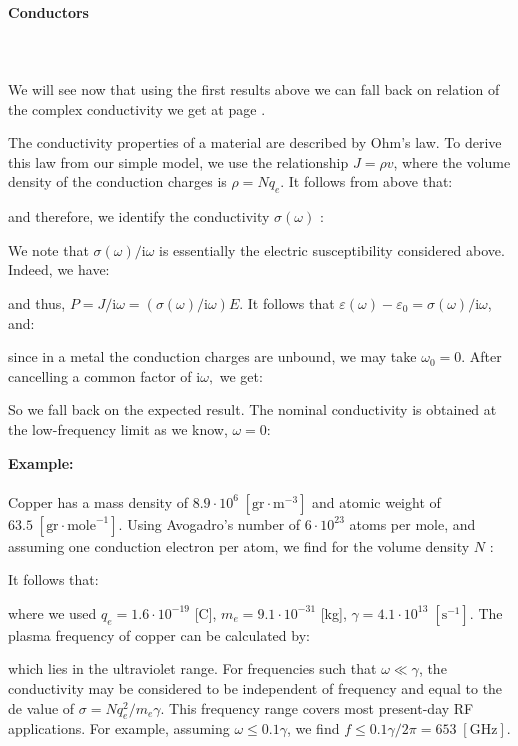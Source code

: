 	\paragraph{Conductors}\mbox{}\\\\
	We will see now that using the first results above we can fall back on relation of the complex conductivity we get at page \pageref{complex conductivity}.
	
	The conductivity properties of a material are described by Ohm's law. To derive this law from our simple model, we use the relationship $J=\rho v$, where the volume density of the conduction charges is $\rho=N q_e$. It follows from above that:
	
	and therefore, we identify the conductivity $\sigma(\omega)$ :
	
	We note that $\sigma(\omega) / \mathrm{i} \omega$ is essentially the electric susceptibility considered above. Indeed, we have:
	
	 and thus, $P=J / \mathrm{i} \omega=(\sigma(\omega) / \mathrm{i} \omega)E$. It follows that $\varepsilon(\omega)-\varepsilon_{0}=\sigma(\omega) / \mathrm{i}\omega$, and:
	
	since in a metal the conduction charges are unbound, we may take $\omega_{0}=0$. After cancelling a common factor of $\mathrm{i} \omega,$ we get:
	
	So we fall back on the expected result. The nominal conductivity is obtained at the low-frequency limit as we know, $\omega=0$:
	
	
	\begin{tcolorbox}[colframe=black,colback=white,sharp corners]
	\textbf{{\Large {}}Example:}\\\\
	Copper has a mass density of $8.9 \cdot 10^{6}\;[\text{gr}\cdot \text{m}^{-3}]$ and atomic weight of $63.5 \; [\text{gr}\cdot\text{mole}^{-1}]$. Using Avogadro's number of $6 \cdot 10^{23}$ atoms per mole, and assuming one conduction electron per atom, we find for the volume density $N$ :
	
	It follows that:
	
where we used $q_e=1.6 \cdot 10^{-19}$ [C], $m_e=9.1 \cdot 10^{-31}$ [kg], $\gamma=4.1\cdot 10^{13}\;[\text{s}^{-1}]$. The plasma frequency of copper can be calculated by:
	
	which lies in the ultraviolet range. For frequencies such that $\omega\ll \gamma$, the conductivity may be considered to be independent of frequency and equal to the de value of $\sigma=N q_e^{2}/m_e\gamma$. This frequency range covers most present-day RF applications. For example, assuming $\omega \leq 0.1 \gamma$, we find $f \leq 0.1 \gamma / 2 \pi=653\; [\text{GHz}]$.
	\end{tcolorbox}
	
